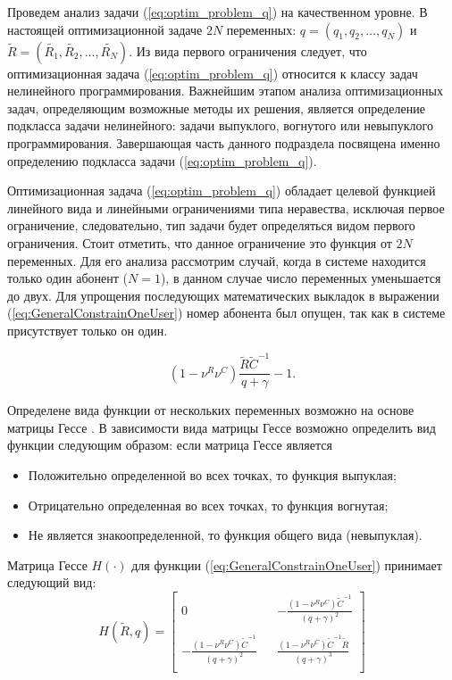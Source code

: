 Проведем анализ задачи (\ref{eq:optim_problem_q}) на качественном уровне. В настоящей оптимизационной задаче $2N$ переменных: $q = (q_1, q_2, \ldots, q_N)$ и $\tilde{R} = (\tilde{R_1}, \tilde{R_2}, \ldots, \tilde{R_N})$. Из вида первого ограничения следует, что оптимизационная задача (\ref{eq:optim_problem_q}) относится к классу задач нелинейного программирования. Важнейшим этапом анализа оптимизационных задач, определяющим возможные методы их решения, является определение подкласса задачи нелинейного: задачи выпуклого, вогнутого или невыпуклого программирования. Завершающая часть данного подраздела посвящена именно определению подкласса задачи (\ref{eq:optim_problem_q}).

Оптимизационная задача (\ref{eq:optim_problem_q}) обладает целевой функцией линейного вида и линейными ограничениями типа неравества, исключая первое ограничение, следовательно, тип задачи будет определяться видом первого ограничения. Стоит отметить, что данное ограничение это функция от $2N$ переменных. Для его анализа рассмотрим случай, когда в системе находится только один абонент ($N=1$), в данном случае число переменных уменьшается до двух. Для упрощения последующих математических выкладок в выражении (\ref{eq:GeneralConstrainOneUser}) номер абонента был опущен, так как в системе присутствует только он один.

\begin{equation}
\left(1-\nu^R\nu^C\right)\frac{\tilde{R} \tilde{C}^{-1} }{q + \gamma} -1.
\label{eq:GeneralConstrainOneUser}
\end{equation}

Определене вида функции от нескольких переменных возможно на основе матрицы Гессе \cite{convex_opt}. В зависимости вида матрицы Гессе возможно определить вид функции следующим образом: если матрица Гессе является
\begin{itemize}
	\item Положительно определенной во всех точках, то функция выпуклая;
	\item Отрицательно определенная во всех точках, то функция вогнутая;
	\item Не является знакоопределенной, то функция общего вида (невыпуклая).
\end{itemize}

Матрица Гессе $H(\cdot)$ для функции (\ref{eq:GeneralConstrainOneUser}) принимает следующий вид:
$$H(\tilde{R}, q)=
  \left[ {\begin{array}{ccc}
   0 & &-\frac{\left(1-\nu^R\nu^C\right)\tilde{C}^{-1}}{(q + \gamma)^2} \\
   & & \\
   -\frac{\left(1-\nu^R\nu^C\right)\tilde{C}^{-1}}{(q + \gamma)^2} & & \frac{\left(1-\nu^R\nu^C\right)\tilde{C}^{-1} \tilde{R}}{(q + \gamma)^3} \\
  \end{array} } \right]
$$

